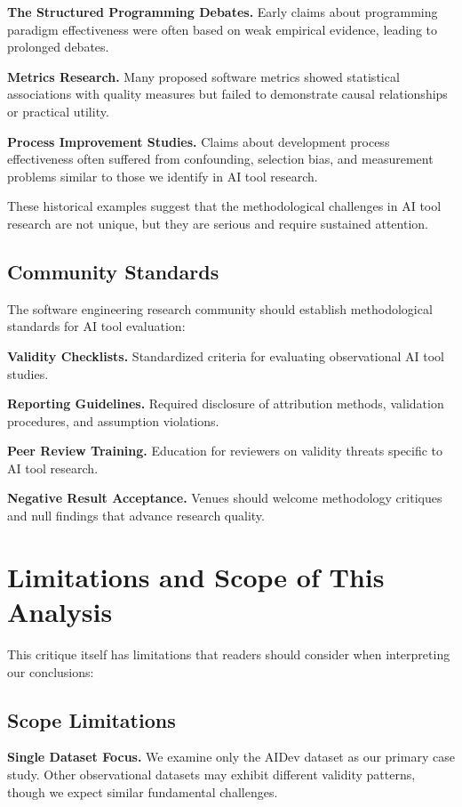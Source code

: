 \documentclass[conference]{IEEEtran}
\begin{document}
\textbf{The Structured Programming Debates.} Early claims about programming paradigm effectiveness were often based on weak empirical evidence, leading to prolonged debates.

\textbf{Metrics Research.} Many proposed software metrics showed statistical associations with quality measures but failed to demonstrate causal relationships or practical utility.

\textbf{Process Improvement Studies.} Claims about development process effectiveness often suffered from confounding, selection bias, and measurement problems similar to those we identify in AI tool research.

These historical examples suggest that the methodological challenges in AI tool research are not unique, but they are serious and require sustained attention.

\subsection{Community Standards}

The software engineering research community should establish methodological standards for AI tool evaluation:

\textbf{Validity Checklists.} Standardized criteria for evaluating observational AI tool studies.

\textbf{Reporting Guidelines.} Required disclosure of attribution methods, validation procedures, and assumption violations.

\textbf{Peer Review Training.} Education for reviewers on validity threats specific to AI tool research.

\textbf{Negative Result Acceptance.} Venues should welcome methodology critiques and null findings that advance research quality.

\section{Limitations and Scope of This Analysis}

This critique itself has limitations that readers should consider when interpreting our conclusions:

\subsection{Scope Limitations}

\textbf{Single Dataset Focus.} We examine only the AIDev dataset as our primary case study. Other observational datasets may exhibit different validity patterns, though we expect similar fundamental challenges.
\end{document}
